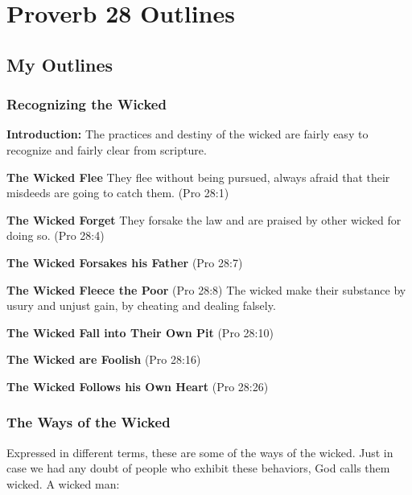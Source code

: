 \section{Proverb 28 Outlines}

\subsection{My Outlines}


\subsubsection{Recognizing the Wicked}
\textbf{Introduction: }The practices and destiny of the wicked are fairly easy to recognize and fairly clear from scripture.%

\begin{compactenum}[I.]
    \item \textbf{The Wicked Flee} They flee without being pursued, always afraid that their misdeeds are going to catch them. (Pro 28:1) 
    \item \textbf{The Wicked Forget} They forsake the law and are praised by other wicked for doing so. (Pro 28:4) 
    \item \textbf{The Wicked Forsakes his Father} (Pro 28:7)
    \item \textbf{The Wicked Fleece the Poor} (Pro 28:8) The wicked make their substance by usury and unjust gain, by cheating and dealing falsely.
    \item \textbf{The Wicked Fall into Their Own Pit} (Pro 28:10)
    \item \textbf{The Wicked are Foolish} (Pro 28:16)
    \item \textbf{The Wicked Follows his Own Heart} (Pro 28:26)
\end{compactenum}

\subsubsection{The Ways of  the Wicked}
Expressed in different terms, these are some of the ways of the wicked. Just in case we had any doubt of people who exhibit these behaviors, God calls them wicked. A wicked man:

